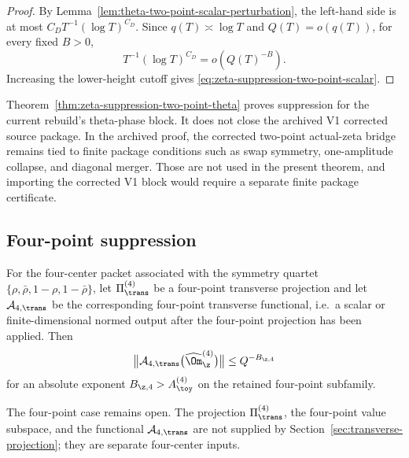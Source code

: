 \begin{proof}
By Lemma~\ref{lem:theta-two-point-scalar-perturbation}, the left-hand side
is at most \(C_D T^{-1}(\log T)^{C_D}\).  Since
\(q(T)\asymp\log T\) and \(Q(T)=o(q(T))\), for every fixed \(B>0\),
\[
        T^{-1}(\log T)^{C_D}=o(Q(T)^{-B}).
\]
Increasing the lower-height cutoff gives \eqref{eq:zeta-suppression-two-point-scalar}.
\end{proof}

\begin{remark}
\label{rem:theta-suppression-not-v1-corrected-package}
Theorem~\ref{thm:zeta-suppression-two-point-theta} proves suppression for
the current rebuild's theta-phase block.  It does not close the archived V1
corrected source package.  In the archived proof, the corrected two-point
actual-zeta bridge remains tied to finite package conditions such as swap
symmetry, one-amplitude collapse, and diagonal merger.  Those are not used in
the present theorem, and importing the corrected V1 block would require a
separate finite package certificate.
\end{remark}

\subsection{Four-point suppression}
\label{subsec:four-point-suppression}

\begin{hypothesis}
\label{hyp:zeta-suppression-four-point}
For the four-center packet associated with the symmetry quartet
\(\{\rho,\bar\rho,1-\rho,1-\bar\rho\}\), let
\(\Pi_\trans^{(4)}\) be a four-point transverse projection and let
\(\mathcal A_{4,\trans}\) be the corresponding four-point transverse
functional, i.e.\ a scalar or finite-dimensional normed output after the
four-point projection has been applied.  Then
\begin{equation}
\label{eq:zeta-suppression-four-point-transverse}
        \bigl\|\mathcal A_{4,\trans}\bigl(\widehat\Om_\z^{(4)}\bigr)\bigr\|
        \le Q^{-B_{\z,4}}
\end{equation}
for an absolute exponent \(B_{\z,4}>A_\toy^{(4)}\) on the retained
four-point subfamily.
\end{hypothesis}

\begin{wip}\label{rem:wip-zeta-suppression-four-point}
The four-point case remains open.  The projection \(\Pi_\trans^{(4)}\), the
four-point value subspace, and the functional \(\mathcal A_{4,\trans}\) are
not supplied by Section~\ref{sec:transverse-projection}; they are separate
four-center inputs.
\end{wip}


